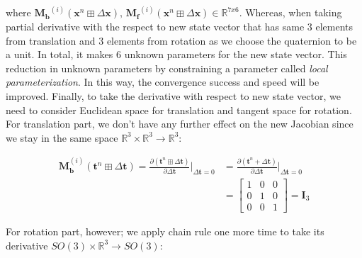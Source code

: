 \documentclass[a4paper]{report}
\numberwithin{figure}{section}
\newcommand{\R}{\mathbb{R}}
\begin{document}
\begin{appendices}
where $\mathbf{M_b}^{(i)}(\mathbf{x}^n\boxplus \Delta \mathbf{x}) \text{, } 
\mathbf{M_f}^{(i)}(\mathbf{x}^n\boxplus \Delta \mathbf{x}) \in \R^{7x6}$.
Whereas, when taking partial derivative with the respect to 
new state vector that has same 3 elements from translation and 3 elements from 
rotation as we choose the quaternion to be a unit.
In total, it makes 6 unknown parameters for the new state vector. 
This reduction in unknown parameters by constraining a parameter 
called \textit{local parameterization}. In this way, the convergence success 
and 
speed will be improved. 
Finally, to take the derivative with respect to new state vector, we need to consider 
Euclidean space for translation and tangent space for rotation. For translation part, 
we don't have any further effect on the new Jacobian since we stay in the same space 
$\R^3 \times \R^3 \rightarrow \R^3$:

\begin{equation}
  \begin{aligned}
  \mathbf{M}^{(i)}_{\mathbf{b}}(\mathbf{t}^n \boxplus \Delta \mathbf{t}) = 
    \frac{\partial (\mathbf{t}^{n} \boxplus \Delta \mathbf{t})}{\partial \Delta \mathbf{t}} 
    \bigg|_{\Delta \mathbf{t} = 0} & =
  \frac{\partial (\mathbf{t}^{n} + \Delta \mathbf{t})}{\partial \Delta \mathbf{t}}
    \bigg|_{\Delta \mathbf{t} = 0} \\
    & =
      \begin{bmatrix} 
        1 & 0 & 0 \\  
        0 & 1 & 0 \\  
        0 & 0 & 1
      \end{bmatrix} = \mathbf{I}_3
  \end{aligned}
\end{equation}

For rotation part, however; we apply chain rule one more time to take its derivative 
$SO(3) \times \R^3 \rightarrow SO(3)$:


\end{appendices}
\end{document}
